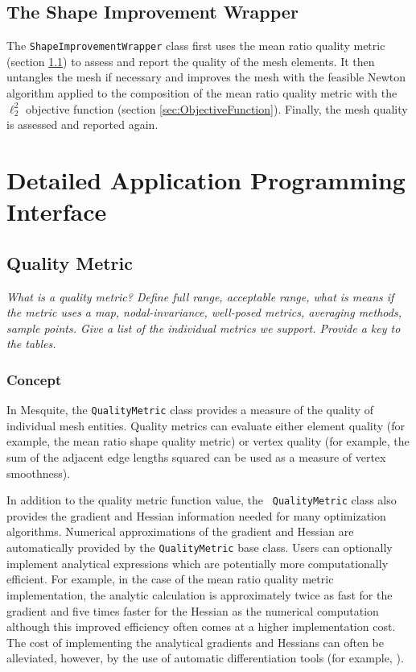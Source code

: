 \subsection{The Shape Improvement Wrapper}

The \texttt{ShapeImprovementWrapper} class 
first uses the mean ratio quality
metric (section \ref{sec:QualityMetric}) to assess and report the quality of the mesh elements. It then
untangles the mesh if necessary and improves the mesh with the
feasible Newton algorithm applied to the composition of the mean ratio
quality metric with the $\ell_2^2$ objective function (section \ref{sec:ObjectiveFunction}). Finally, the
mesh quality is assessed and reported again. 


\section{Detailed Application Programming Interface}
\label{sec:detailedAPI}

\subsection{Quality Metric} \label{sec:QualityMetric}

{\it 
What is a quality metric? Define full range, acceptable range, what is means 
if the metric uses a map, nodal-invariance, well-posed metrics, averaging 
methods, sample points. Give a list of the individual metrics we support. 
Provide a key to the tables.
}

\subsubsection{Concept}

In Mesquite, the \texttt{QualityMetric} class provides a measure of
the quality of individual mesh entities.  Quality metrics can evaluate
either element quality (for example, the mean ratio shape quality
metric) or vertex quality (for example, the sum of the adjacent edge
lengths squared can be used as a measure of vertex smoothness).  

In addition to the quality metric function value, the {\tt
QualityMetric} class also provides the gradient and Hessian
information needed for many optimization algorithms.  Numerical
approximations of the gradient and Hessian are automatically provided
by the \texttt{QualityMetric} base class.  Users can optionally
implement analytical expressions which are potentially more
computationally efficient.  For example, in the case of the mean ratio
quality metric implementation, the analytic calculation is
approximately twice as fast for the gradient and five times faster for the Hessian
as the numerical computation although this
improved efficiency often comes at a higher implementation cost.  The
cost of implementing the analytical gradients and Hessians can often
be alleviated, however, by the use of automatic differentiation tools
(for example, \cite{bischofadic}).

